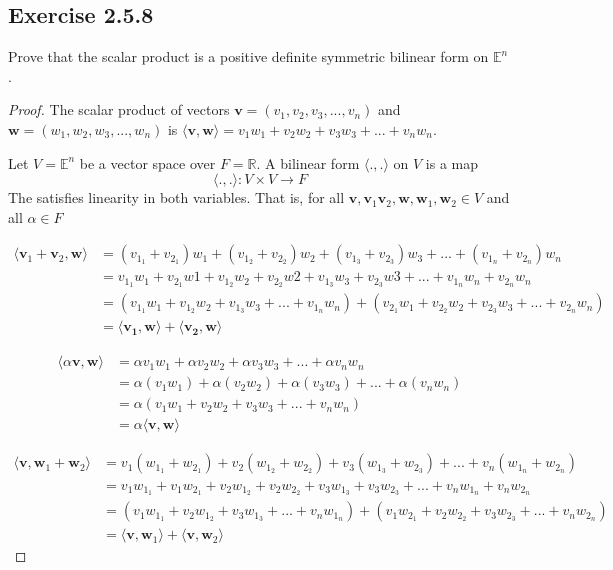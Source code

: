 \documentclass{tufte-book}
\theoremstyle{mytheoremstyle}
\theoremstyle{mylemstyle}
\theoremstyle{mydefstyle}
\begin{document}
\subsection{Exercise 2.5.8}
Prove that the scalar product is a positive definite symmetric bilinear form on $\mathbb{E}^n$.

\begin{proof}
The scalar product of vectors $\mathbf{v} = (v_1, v_2, v_3,...,v_n)$ and $\mathbf{w} = (w_1, w_2, w_3,...,w_n)$ is $\langle\mathbf{v}, \mathbf{w}\rangle = v_1w_1 + v_2w_2 + v_3w_3 +...+ v_nw_n$. 

Let $V = \mathbb{E}^n$ be a vector space over $F = \mathbb{R}$.  A bilinear form $\langle.,.\rangle$ on $V$ is a map 
\[\langle.,.\rangle : V \times V \rightarrow F \]
The satisfies linearity in both variables.  That is, for all $\mathbf{v},\mathbf{v}_1\mathbf{v}_2,\mathbf{w},\mathbf{w}_1,\mathbf{w}_2 \in V$ and all $\alpha \in F$

\begin{align*}
\langle\mathbf{v}_1+\mathbf{v}_2, \mathbf{w} \rangle &= (v_{1_{1}}+v_{2_{1}})w_1 + (v_{1_{2}}+v_{2_{2}})w_2 + (v_{1_{3}}+v_{2_{3}})w_3 +...+(v_{1_{n}}+v_{2_{n}})w_n  \\
&= v_{1_{1}}w_1 + v_{2_{1}}w1 + v_{1_{2}}w_2 + v_{2_{2}}w2 + v_{1_{3}}w_3 + v_{2_{3}}w3 +...+v_{1_{n}}w_n + v_{2_{n}}w_n \\
&= (v_{1_{1}}w_1 + v_{1_{2}}w_2 + v_{1_{3}}w_3 +...+v_{1_{n}}w_n) + (v_{2_{1}}w_1 + v_{2_{2}}w_2 + v_{2_{3}}w_3 +...+v_{2_{n}}w_n)\\
&= \langle\mathbf{v_1},\mathbf{w} \rangle + \langle\mathbf{v_2},\mathbf{w} \rangle
\end{align*}

\begin{align*}
\langle \alpha \mathbf{v},\mathbf{w} \rangle &= \alpha v_1 w_1 + \alpha v_2 w_2 + \alpha v_3 w_3 +...+ \alpha v_n w_n \\
&= \alpha(v_1w_1) + \alpha(v_2w_2) + \alpha(v_3w_3) +...+\alpha(v_nw_n) \\
&=\alpha (v_1w_1 + v_2w_2 + v_3w_3 +...+v_nw_n) \\
&= \alpha \langle \mathbf{v}, \mathbf{w} \rangle 
\end{align*}

\begin{align*}
\langle \mathbf{v}, \mathbf{w}_1+\mathbf{w}_2 \rangle &= v_1(w_{1_{1}}+w_{2_{1}}) + v_2(w_{1_{2}}+w_{2_{2}}) + v_3(w_{1_{3}}+w_{2_{3}}) +...+v_n(w_{1_{n}}+w_{2_{n}})  \\
&= v_1w_{1_{1}} + v_1w_{2_{1}} + v_2w_{1_{2}}+ v_2w_{2_{2}} + v_3w_{1_{3}}+ v_3w_{2_{3}} +...+v_nw_{1_{n}}+ v_nw_{2_{n}}\\
&= (v_1w_{1_{1}} + v_2w_{1_{2}} + v_3w_{1_{3}} +...+v_nw_{1_{n}}) +
(v_1w_{2_{1}} + v_2w_{2_{2}} + v_3w_{2_{3}} +...+v_nw_{2_{n}}) \\
&= \langle \mathbf{v}, \mathbf{w}_1 \rangle + \langle \mathbf{v}, \mathbf{w}_2 \rangle
\end{align*}


\end{proof}
\end{document}
